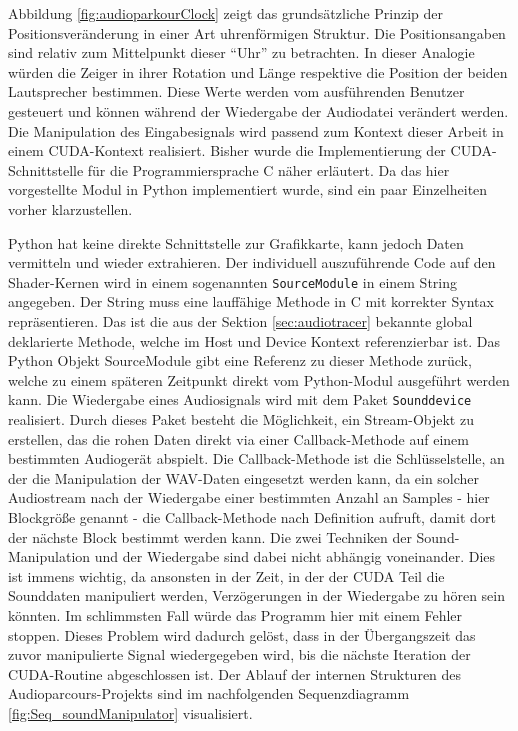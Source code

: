 Abbildung \ref{fig:audioparkourClock} zeigt das grundsätzliche Prinzip der Positionsveränderung in einer Art uhrenförmigen Struktur. Die Positionsangaben sind relativ zum Mittelpunkt dieser \enquote{Uhr} zu betrachten. In dieser Analogie würden die Zeiger in ihrer Rotation und Länge respektive die Position der beiden Lautsprecher bestimmen. Diese Werte werden vom ausführenden Benutzer gesteuert und können während der Wiedergabe der Audiodatei verändert werden. Die Manipulation des Eingabesignals wird passend zum Kontext dieser Arbeit in einem CUDA-Kontext realisiert. Bisher wurde die Implementierung der CUDA-Schnittstelle für die Programmiersprache C näher erläutert. Da das hier vorgestellte Modul in Python implementiert wurde, sind ein paar Einzelheiten vorher klarzustellen. 

Python hat keine direkte Schnittstelle zur Grafikkarte, kann jedoch Daten vermitteln und wieder extrahieren. Der individuell auszuführende Code auf den Shader-Kernen wird in einem sogenannten \texttt{SourceModule} in einem String angegeben. Der String muss eine lauffähige Methode in C mit korrekter Syntax repräsentieren. Das ist die aus der Sektion \ref{sec:audiotracer} bekannte global deklarierte Methode, welche im Host und Device Kontext referenzierbar ist. Das Python Objekt SourceModule gibt eine Referenz zu dieser Methode zurück, welche zu einem späteren Zeitpunkt direkt vom Python-Modul ausgeführt werden kann.
Die Wiedergabe eines Audiosignals wird mit dem Paket \texttt{Sounddevice} realisiert. Durch dieses Paket besteht die Möglichkeit, ein Stream-Objekt zu erstellen, das die rohen Daten direkt via einer Callback-Methode auf einem bestimmten Audiogerät abspielt. Die Callback-Methode ist die Schlüsselstelle, an der die Manipulation der WAV-Daten eingesetzt werden kann, da ein solcher Audiostream nach der Wiedergabe einer bestimmten Anzahl an Samples - hier Blockgröße genannt - die Callback-Methode nach Definition aufruft, damit dort der nächste Block bestimmt werden kann.
Die zwei Techniken der Sound-Manipulation und der Wiedergabe sind dabei nicht abhängig voneinander. Dies ist immens wichtig, da ansonsten in der Zeit, in der der CUDA Teil die Sounddaten manipuliert werden, Verzögerungen in der Wiedergabe zu hören sein könnten. Im schlimmsten Fall würde das Programm hier mit einem Fehler stoppen. Dieses Problem wird dadurch gelöst, dass in der Übergangszeit das zuvor manipulierte Signal wiedergegeben wird, bis die nächste Iteration der CUDA-Routine abgeschlossen ist. 
Der Ablauf der internen Strukturen des Audioparcours-Projekts sind im nachfolgenden Sequenzdiagramm \ref{fig:Seq_soundManipulator} visualisiert.

